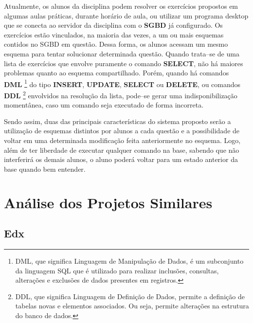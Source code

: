 \documentclass[graduacao,brazil]{ThesisPUC}
\begin{document}
Atualmente, os alunos da disciplina podem resolver os exerc\'{i}cios propostos em algumas
aulas pr\'{a}ticas, durante hor\'{a}rio de aula, ou utilizar um programa desktop que se conecta ao
servidor da disciplina com o \textbf{SGBD} \cite{ElmasriNavathe05} j\'{a} configurado. 
Os exerc\'{i}cios est\~{a}o vinculados, na maioria das vezes, a um ou mais esquemas contidos no SGBD 
em quest\~{a}o. Dessa forma, os alunos acessam um mesmo esquema para tentar solucionar determinada quest\~{a}o.
Quando trata--se de uma lista de exerc\'{i}cios que envolve puramente o comando \textbf{SELECT}, n\~{a}o h\'{a}
maiores problemas quanto ao esquema compartilhado.
Por\'{e}m, quando h\'{a} comandos \textbf{DML} \footnote{DML, que significa Linguagem de Manipula\c{c}\~{a}o de Dados,
\'{e} um subconjunto da linguagem SQL que \'{e} utilizado para realizar inclus\~{o}es, consultas, altera\c{c}\~{o}es e
exclus\~{o}es de dados presentes em registros.} \cite{ElmasriNavathe05} do tipo \textbf{INSERT}, \textbf{UPDATE}, 
\textbf{SELECT} ou \textbf{DELETE}, ou comandos \textbf{DDL} \footnote{DDL, que significa Linguagem de Defini\c{c}\~{a}o
de Dados, permite a defini\c{c}\~{a}o de tabelas novas e elementos associados. Ou seja, permite altera\c{c}\~{o}es na 
estrutura do banco de dados.} \cite{ElmasriNavathe05} envolvidos na resolu\c{c}\~{a}o da lista, pode--se
gerar uma indisponibiliza\c{c}\~{a}o moment\^{a}nea, caso um comando seja executado de forma incorreta.

Sendo assim, duas das principais caracter\'{i}sticas do sistema proposto ser\~{a}o a utiliza\c{c}\~{a}o de
esquemas distintos por alunos a cada quest\~{a}o e a possibilidade de voltar em uma determinada
modifica\c{c}\~{a}o feita anteriormente no esquema. Logo, al\'{e}m de ter liberdade de executar qualquer
comando na base, sabendo que n\~{a}o interferir\'{a} os demais alunos, o aluno poder\'{a} voltar para um
estado anterior da base quando bem entender.

\pagebreak


\section{An\'{a}lise dos Projetos Similares}

\subsection{Edx}
\end{document}
